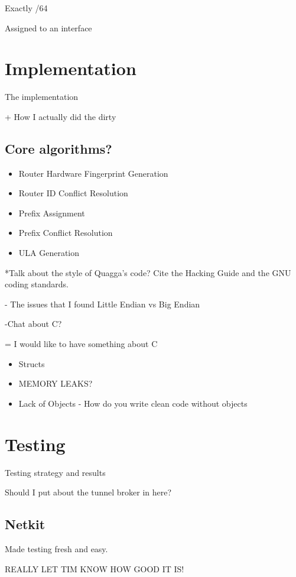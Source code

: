 \documentclass[12pt]{report}
\begin{document}
Exactly /64 

Assigned to an interface

\chapter{Implementation}
The implementation

+ How I actually did the dirty

\section{Core algorithms?}

\begin{itemize}
  \item Router Hardware Fingerprint Generation
  \item Router ID Conflict Resolution
  \item Prefix Assignment
  \item Prefix Conflict Resolution
  \item ULA Generation
\end{itemize} 

*Talk about the style of Quagga's code?
Cite the Hacking Guide and the GNU coding standards.

- The issues that I found
    Little Endian vs Big Endian
    
-Chat about C?

= I would like to have something about C

\begin{itemize}
  \item Structs
  \item MEMORY LEAKS?
  \item Lack of Objects - How do you write clean code without objects
\end{itemize}

\chapter{Testing}
Testing strategy and results

Should I put about the tunnel broker in here?

\section{Netkit} 
Made testing fresh and easy. 

REALLY LET TIM KNOW HOW GOOD IT IS!
\end{document}
